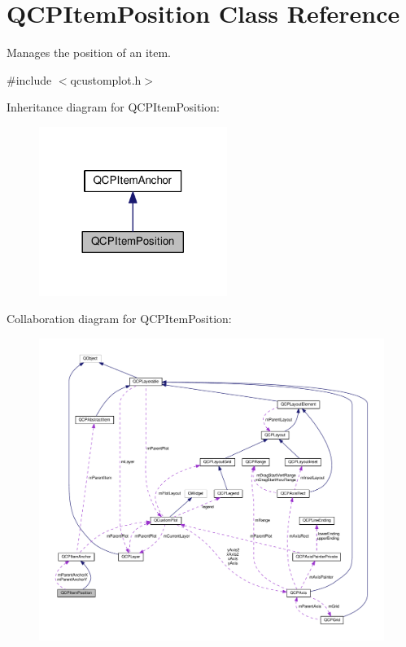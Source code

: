 \hypertarget{classQCPItemPosition}{}\section{Q\+C\+P\+Item\+Position Class Reference}
\label{classQCPItemPosition}


Manages the position of an item.  




{\ttfamily \#include $<$qcustomplot.\+h$>$}



Inheritance diagram for Q\+C\+P\+Item\+Position\+:\nopagebreak
\begin{figure}[H]
\begin{center}
\leavevmode
\includegraphics[width=173pt]{classQCPItemPosition__inherit__graph}
\end{center}
\end{figure}


Collaboration diagram for Q\+C\+P\+Item\+Position\+:\nopagebreak
\begin{figure}[H]
\begin{center}
\leavevmode
\includegraphics[width=350pt]{classQCPItemPosition__coll__graph}
\end{center}
\end{figure}
